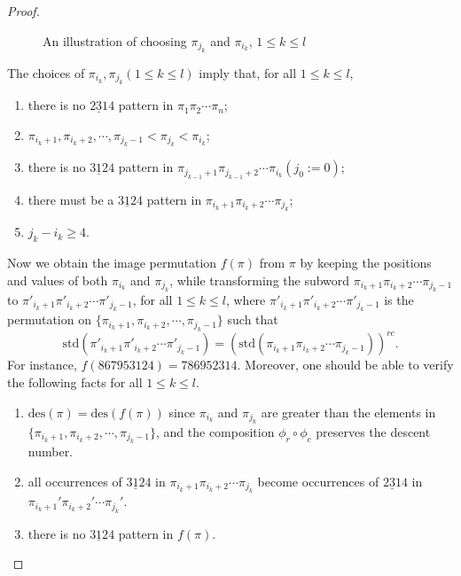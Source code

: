 \documentclass[11pt,reqno]{amsart}
\numberwithin{equation}{section}
\theoremstyle{plain}
\theoremstyle{definition}
\def\des{\mathrm{des}}
\def\std{\mathrm{std}}
\begin{document}
\begin{proof}
\begin{figure}[ht]
    \caption{An illustration of choosing $\pi_{j_k}$ and $\pi_{i_k}$, $1\le k\le l$}
    \label{fig:312-4}
  \end{figure}

  The choices of $\pi_{i_k},\pi_{j_k}(1\le k \le l)$ imply that,  
  for all $1\le k \le l$, 
  \begin{enumerate}[label=(\roman*)]
      \item there is no $\underline{231}4$ pattern in $\pi_1\pi_2\cdots \pi_{n}$;
      \item $\pi_{i_k+1},\pi_{i_k+2},\cdots ,\pi_{j_k-1}<\pi_{j_k}<\pi_{i_k}$;
      \item there is no $\underline{312}4$ pattern in $\pi_{j_{k-1}+1}\pi_{j_{k-1}+2}\cdots \pi_{i_{k}}(j_{0}:=0)$;
      \item there must be a $\underline{312}4$ pattern in $\pi_{i_k+1} \pi_{i_k+2}\cdots \pi_{j_k}$;
      \item $j_k-i_k\ge 4$.
  \end{enumerate}
  Now we obtain the image permutation $f(\pi)$ from $\pi$ by keeping the positions and values of both $\pi_{i_k}$ and $\pi_{j_k}$, while transforming the subword $\pi_{i_k+1}\pi_{i_k+2}\cdots \pi_{j_{k}-1}$ to $\pi'_{i_k+1}\pi'_{i_k+2}\cdots \pi'_{j_k-1}$, for all $1\le k\le l$, where
  $\pi'_{i_k+1}\pi'_{i_k+2}\cdots \pi'_{j_k-1}$ is the permutation on
  $\{\pi_{i_k+1},\pi_{i_k+2},\cdots, \pi_{j_k-1}\}$ such that
  $$\std(\pi'_{i_k+1}\pi'_{i_k+2}\cdots \pi'_{j_k-1})=(\std (\pi_{i_k+1}\pi_{i_k+2}\cdots \pi_{j_k-1}))^{rc}.$$
  For instance, $f(867953124)=786952314$. Moreover, one should be able to verify the following facts for all $1\le k \le l$.
  \begin{enumerate}[label=(\roman*)]
      \item $\des(\pi)=\des(f(\pi))$ since $\pi_{i_k}$ and $\pi_{j_k}$ are greater than 
      the elements in \\ $\{\pi_{i_k+1},\pi_{i_k+2},\cdots, \pi_{j_k-1}\}$, and the composition $\phi_r\circ\phi_c$ preserves the descent number.
      \item all occurrences of $\underline{312}4$ in $\pi_{i_k+1} \pi_{i_k+2}\cdots \pi_{j_k}$ become occurrences of $\underline{231}4$ in $\pi_{i_k+1}' \pi_{i_k+2}'\cdots \pi_{j_k}'$.
      \item there is no $\underline{312}4$ pattern in $f(\pi)$.

\end{enumerate}
\end{proof}
\end{document}
